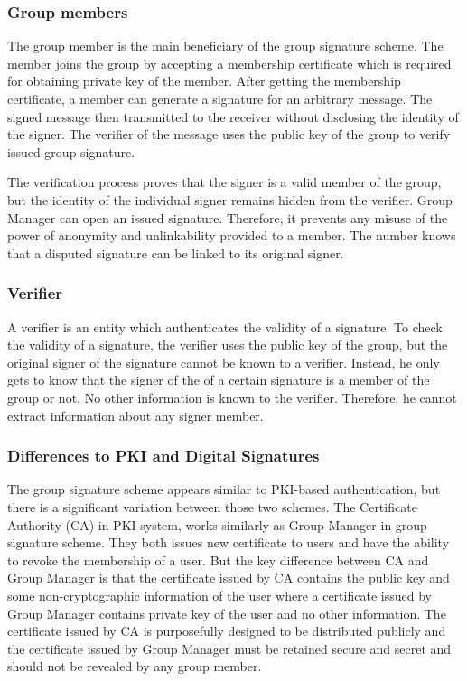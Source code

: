 \subsubsection{Group members}
The group member is the main beneficiary of the group signature scheme. The member joins the group by accepting a membership certificate which is required for obtaining private key of the member. After getting the membership certificate, a member can generate a signature for an arbitrary message. The signed message then transmitted to the receiver without disclosing the identity of the signer. The verifier of the message uses the public key of the group to verify issued group signature. 

The verification process proves that the signer is a valid member of the group, but the identity of the individual signer remains hidden from the verifier. Group Manager can open an issued signature. Therefore, it prevents any misuse of the power of anonymity and unlinkability provided to a member. The number knows that a disputed signature can be linked to its original signer.
\subsubsection{Verifier}
A verifier is an entity which authenticates the validity of a signature. To check the validity of a signature, the verifier uses the public key of the group, but the original signer of the signature cannot be known to a verifier. Instead, he only gets to know that the signer of the of a certain signature is a member of the group or not. No other information is known to the verifier. Therefore, he cannot extract information about any signer member.  

\subsubsection{Differences to PKI and Digital Signatures}
The group signature scheme appears similar to PKI-based authentication, but there is a significant variation between those two schemes. The Certificate Authority (CA) in PKI system, works similarly as Group Manager in group signature scheme. They both issues new certificate to users and have the ability to revoke the membership of a user. But the key difference between CA and Group Manager is that the certificate issued by CA contains the public key and some non-cryptographic information of the user where a certificate issued by Group Manager contains private key of the user and no other information. The certificate issued by CA is purposefully designed to be distributed publicly and the certificate issued by Group Manager must be retained secure and secret and should not be revealed by any group member.

